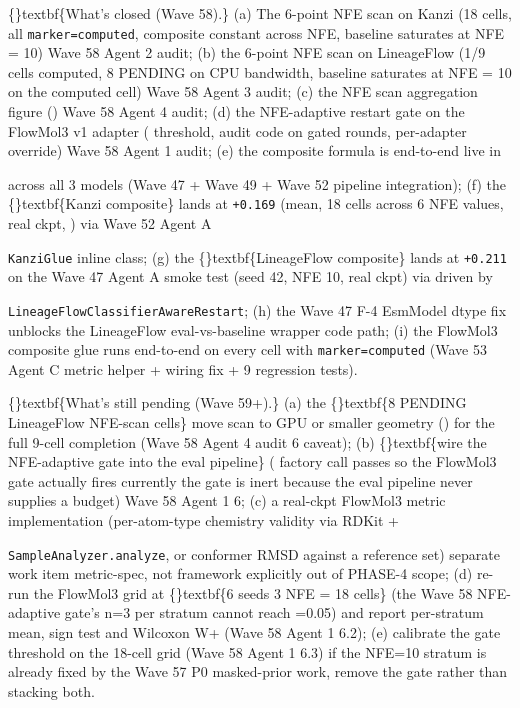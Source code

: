 \documentclass{article}
\begin{document}
\{\}textbf\{What's closed (Wave 58).\} (a) The 6-point NFE scan on Kanzi (18 cells, all \texttt{marker=computed}, composite constant across NFE, baseline saturates at NFE = 10)  Wave 58 Agent 2 audit; (b) the 6-point NFE scan on LineageFlow (1/9 cells computed, 8 PENDING on CPU bandwidth, baseline saturates at NFE = 10 on the computed cell)  Wave 58 Agent 3 audit; (c) the NFE scan aggregation figure ()  Wave 58 Agent 4 audit; (d) the NFE-adaptive restart gate on the FlowMol3 v1 adapter ( threshold, audit code on gated rounds, per-adapter  override)  Wave 58 Agent 1 audit; (e) the composite formula is end-to-end live in

 across all 3 models (Wave 47 + Wave 49 + Wave 52 pipeline integration); (f) the \{\}textbf\{Kanzi composite\} lands at \texttt{+0.169} (mean, 18 cells across 6 NFE values, real ckpt, ) via Wave 52 Agent A

\texttt{KanziGlue} inline class; (g) the \{\}textbf\{LineageFlow composite\} lands at \texttt{+0.211} on the Wave 47 Agent A smoke test (seed 42, NFE 10, real ckpt) via  driven by

\texttt{LineageFlowClassifierAwareRestart}; (h) the Wave 47 F-4 EsmModel dtype fix unblocks the LineageFlow eval-vs-baseline wrapper code path; (i) the FlowMol3 composite glue runs end-to-end on every cell with \texttt{marker=computed} (Wave 53 Agent C metric helper + wiring fix + 9 regression tests).

\{\}textbf\{What's still pending (Wave 59+).\} (a) the \{\}textbf\{8 PENDING LineageFlow NFE-scan cells\}  move scan to GPU or smaller geometry () for the full 9-cell completion (Wave 58 Agent 4 audit 6 caveat); (b) \{\}textbf\{wire the NFE-adaptive gate into the eval pipeline\} ( factory call passes  so the FlowMol3 gate actually fires  currently the gate is inert because the eval pipeline never supplies a budget)  Wave 58 Agent 1 6; (c) a real-ckpt FlowMol3 metric implementation (per-atom-type chemistry validity via RDKit +

\texttt{SampleAnalyzer.analyze}, or conformer RMSD against a reference set)  separate work item  metric-spec, not framework  explicitly out of PHASE-4 scope; (d) re-run the FlowMol3 grid at \{\}textbf\{6 seeds  3 NFE = 18 cells\} (the Wave 58 NFE-adaptive gate's n=3 per stratum cannot reach =0.05) and report per-stratum mean, sign test and Wilcoxon W+ (Wave 58 Agent 1 6.2); (e) calibrate the gate threshold on the 18-cell grid (Wave 58 Agent 1 6.3)  if the NFE=10 stratum is already fixed by the Wave 57 P0 masked-prior work, remove the gate rather than stacking both.
\end{document}
